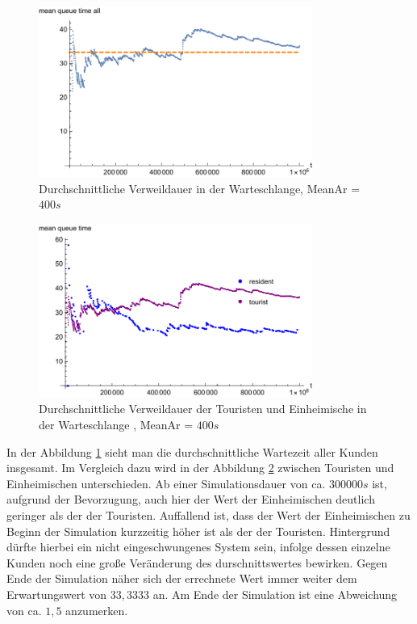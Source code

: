 \begin{figure}[htpb]
	\centering
	\includegraphics[width=0.8\textwidth]{abbildungen/1_Phone_VIP/Arrival_400_Serve_100_dur_1000000_Skip_0/MeanQueueTimeAll.pdf}
	\caption{Durchschnittliche Verweildauer in der Warteschlange, MeanAr = $400s$}
	\label{fig:MQTVIP400ALL}
\end{figure}

\begin{figure}[htpb]
	\centering
	\includegraphics[width=0.8\textwidth]{abbildungen/1_Phone_VIP/Arrival_400_Serve_100_dur_1000000_Skip_0/MeanQueueTimeTouristAndResident.pdf}
	\caption{Durchschnittliche Verweildauer der Touristen und Einheimische in der Warteschlange , MeanAr = $400s$}
	\label{fig:MQTVIP400VGL}
\end{figure}

In der Abbildung \ref{fig:MQTVIP400ALL} sieht man die durchschnittliche Wartezeit aller Kunden insgesamt. Im Vergleich dazu wird in der Abbildung \ref{fig:MQTVIP400VGL} zwischen Touristen und Einheimischen unterschieden. Ab einer Simulationsdauer von ca. $300000s$ ist, aufgrund der Bevorzugung, auch hier der Wert der Einheimischen deutlich geringer als der der Touristen. Auffallend ist, dass der Wert der Einheimischen zu Beginn der Simulation kurzzeitig höher ist als der der Touristen. Hintergrund dürfte hierbei ein nicht eingeschwungenes System sein, infolge dessen einzelne Kunden noch eine große Veränderung des durschnittswertes bewirken. Gegen Ende der Simulation näher sich der errechnete Wert immer weiter dem Erwartungswert von $33,3333$ an. Am Ende der Simulation ist eine Abweichung von ca. $1,5$ anzumerken.

